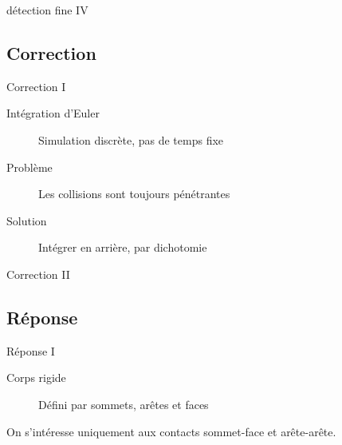 \documentclass{beamer}
\begin{document}
\begin{frame}{détection fine IV}
  \begin{figure}
    \centering
    
    
    
    
    
    
  \end{figure}
\end{frame}

\subsection{Correction}

\begin{frame}{Correction I}
  \begin{description}
  \item[Intégration d'Euler] Simulation discrète, pas de temps fixe
  \item[Problème] Les collisions sont toujours pénétrantes
  \end{description}

  \vfill

  \begin{figure}
    \centering
    
  \end{figure}

  \vfill

  \begin{description}
  \item[Solution] Intégrer en arrière, par dichotomie
  \end{description}
\end{frame}

\begin{frame}{Correction II}
  \begin{figure}
    \centering
    
  \end{figure}
\end{frame}

\subsection{Réponse}

\begin{frame}{Réponse I}
  \begin{description}
  \item[Corps rigide] Défini par sommets, arêtes et faces
  \end{description}
  
  \vfill

  On s'intéresse uniquement aux contacts sommet-face et arête-arête.

  \vfill

  \begin{figure}
    \centering
    
    
  \end{figure}
\end{frame}
\end{document}
